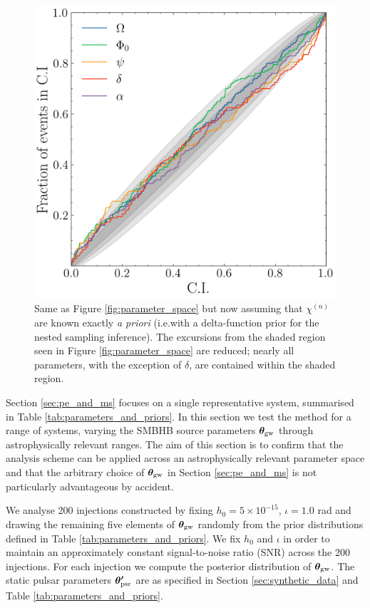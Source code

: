 \documentclass[fleqn,usenatbib,useAMS]{mnras}
\begin{document}
\begin{figure}
	\centering
	\includegraphics[width=\columnwidth]{images/pp_plot_canonical_nochi}
	\caption{Same as Figure \ref{fig:parameter_space} but now assuming that $\chi^{(n)}$ are known exactly \textit{a priori} (i.e.with a delta-function prior for the nested sampling inference). The excursions from the shaded region seen in Figure  \ref{fig:parameter_space} are reduced; nearly all parameters, with the exception of $\delta$, are contained within the shaded region. }
	\label{fig:parameter_space2}
\end{figure}

Section \ref{sec:pe_and_ms} focuses on a single representative system, summarised in Table \ref{tab:parameters_and_priors}. In this section we test the method for a range of systems, varying the SMBHB source parameters $\boldsymbol{\theta}_{\rm gw}$ through astrophysically relevant ranges. The aim of this section is to confirm that the analysis scheme can be applied across an astrophysically relevant parameter space and that the arbitrary choice of $\boldsymbol{\theta}_{\rm gw}$ in Section \ref{sec:pe_and_ms} is not particularly advantageous by accident. \newline 

We analyse 200 injections constructed by fixing $h_0 = 5 \times 10^{-15}$, $\iota =1.0$ rad and drawing the remaining five elements of $\boldsymbol{\theta}_{\rm gw}$ randomly from the prior distributions defined in Table \ref{tab:parameters_and_priors}. We fix $h_0$ and $\iota$ in order to maintain an approximately constant signal-to-noise ratio (SNR) across the 200 injections. For each injection we compute the posterior distribution of ${\boldsymbol{\theta}}_{\rm gw}$. The static pulsar parameters $\boldsymbol{\theta'}_{\rm psr}$ are as specified in Section \ref{sec:synthetic_data} and Table  \ref{tab:parameters_and_priors}. \newline 
\end{document}
